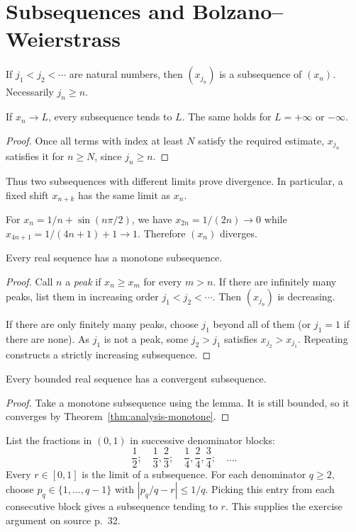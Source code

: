 \section{Subsequences and Bolzano--Weierstrass}
\begin{definition}[Subsequence]
If $j_1<j_2<\cdots$ are natural numbers, then $(x_{j_n})$ is a subsequence
of $(x_n)$. Necessarily $j_n\geq n$.
\end{definition}
\begin{theorem}
If $x_n\to L$, every subsequence tends to $L$. The same holds for
$L=+\infty$ or $-\infty$.
\end{theorem}
\begin{proof}
Once all terms with index at least $N$ satisfy the required estimate,
$x_{j_n}$ satisfies it for $n\geq N$, since $j_n\geq n$.
\end{proof}
Thus two subsequences with different limits prove divergence. In particular,
a fixed shift $x_{n+k}$ has the same limit as $x_n$.

\begin{example}
For $x_n=1/n+\sin(n\pi/2)$, we have $x_{2n}=1/(2n)\to0$ while
$x_{4n+1}=1/(4n+1)+1\to1$. Therefore $(x_n)$ diverges.
\end{example}

\begin{lemma}
Every real sequence has a monotone subsequence.
\end{lemma}
\begin{proof}
Call $n$ a \emph{peak} if $x_n\geq x_m$ for every $m>n$.
If there are infinitely many peaks, list them in increasing order
$j_1<j_2<\cdots$. Then $(x_{j_n})$ is decreasing.

If there are only finitely many peaks, choose $j_1$ beyond all of them
(or $j_1=1$ if there are none). As $j_1$ is not a peak, some $j_2>j_1$
satisfies $x_{j_2}>x_{j_1}$. Repeating constructs a strictly increasing
subsequence.
\end{proof}

\begin{theorem}\label{thm:analysis-bw}
Every bounded real sequence has a convergent subsequence.
\end{theorem}
\begin{proof}
Take a monotone subsequence using the lemma. It is still bounded, so it
converges by Theorem~\ref{thm:analysis-monotone}.
\end{proof}
\begin{example}
List the fractions in $(0,1)$ in successive denominator blocks:
\[
\frac12;\quad \frac13,\frac23;\quad
\frac14,\frac24,\frac34;\quad\ldots.
\]
Every $r\in[0,1]$ is the limit of a subsequence. For each denominator
$q\geq2$, choose $p_q\in\{1,\ldots,q-1\}$ with
$|p_q/q-r|\leq1/q$. Picking this entry from each consecutive block gives
a subsequence tending to $r$. This supplies the exercise argument on
source p.~32.
\end{example}

